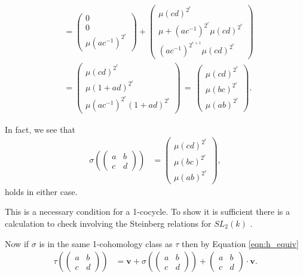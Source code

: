 \begin{align*}
	&=
\left(\begin{matrix} 0 \\ 0 \\ \mu(ac^{-1})^{2^r} \end{matrix}\right)
	+ 
	\left(\begin{matrix} \mu(cd)^{2^r} \\ \mu + (ac^{-1})^{2^r} \mu(cd)^{2^r} \\  (ac^{-1})^{2^{r+1}} \mu(cd)^{2^r} \end{matrix}\right)\\
	&=
\left(\begin{matrix} \mu(cd)^{2^r} \\ \mu(1 + ad)^{2^r} \\ \mu(ac^{-1})^{2^r}(1 + ad)^{2^r} \end{matrix}\right)
	\,=\,\left(\begin{matrix} \mu(cd)^{2^r} \\ \mu(bc)^{2^r} \\ \mu(ab)^{2^r} \end{matrix}\right).
	\end{align*}

	In fact, we see that
	\begin{align*}
	\sigma\left(
			\left(\begin{matrix}a & b \\ c & d\end{matrix}\right)
			\right) &=
	\left(\begin{matrix} \mu(cd)^{2^r} \\ \mu(bc)^{2^r} \\ \mu(ab)^{2^r} \end{matrix}\right),
	\end{align*}
	holds in either case.

	This is a necessary condition for a 1-cocycle. To show it is sufficient there is a calculation to check involving the Steinberg relations for $SL_2(k)$ \cite[Proposition 2]{martin2004nonab}.

	Now if $\sigma$ is in the same 1-cohomology class as $\tau$ then by Equation \ref{eqn:h_equiv}
	\begin{align*}
	\tau\left(
			\left(\begin{matrix} a & b \\ c & d\end{matrix}\right)
			\right) &=
	\mathbf{v} +
	\sigma\left(
			\left(\begin{matrix} a & b \\ c & d\end{matrix}\right)
			\right) 
	+\left(\begin{matrix} a & b \\ c & d\end{matrix}\right)\cdot \mathbf{v}.
	\end{align*}

